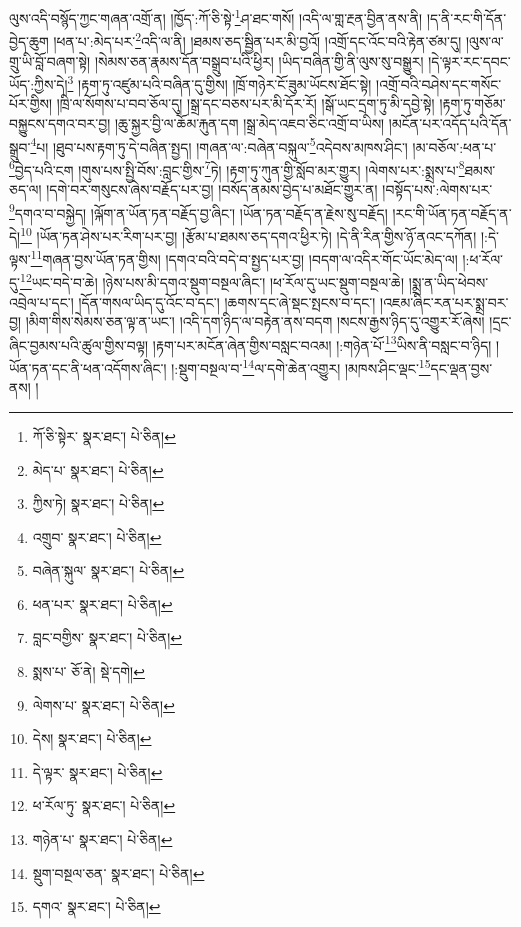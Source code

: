 ལུས་འདི་བསྙོད་ཀྱང་གཞན་འགྲོ་ན། །ཁྱོད་:ཀོ་ཅི་སྟེ་\footnote{ཀོ་ཅི་སྟེར་  སྣར་ཐང་།  པེ་ཅིན། }ཤ་ཐང་གསོ། །འདི་ལ་གླ་རྔན་བྱིན་ནས་ནི། །ད་ནི་རང་གི་དོན་བྱེད་ཆུག །ཕན་པ་:མེད་པར་\footnote{མེད་པ་  སྣར་ཐང་།  པེ་ཅིན། }འདི་ལ་ནི། །ཐམས་ཅད་སྦྱིན་པར་མི་བྱའོ། །འགྲོ་དང་འོང་བའི་རྟེན་ཙམ་དུ། །ལུས་ལ་གྲུ་ཡི་བློ་བཞག་སྟེ། །སེམས་ཅན་རྣམས་དོན་བསྒྲུབ་པའི་ཕྱིར། །ཡིད་བཞིན་གྱི་ནི་ལུས་སུ་བསྒྱུར། །དེ་ལྟར་རང་དབང་ཡོད་:ཀྱིས་དེ།\footnote{ཀྱིས་ཏེ།  སྣར་ཐང་།  པེ་ཅིན། } །རྟག་ཏུ་འཛུམ་པའི་བཞིན་དུ་གྱིས། །ཁྲོ་གཉེར་ངོ་ཟུམ་ཡོངས་ཐོང་སྟེ། །འགྲོ་བའི་བཤེས་དང་གསོང་པོར་གྱིས། །ཁྲི་ལ་སོགས་པ་བབ་ཅོལ་དུ། །སྒྲ་དང་བཅས་པར་མི་དོར་རོ། །སྒོ་ཡང་དྲག་ཏུ་མི་དབྱེ་སྟེ། །རྟག་ཏུ་གཅོམ་བསྐྱུངས་དགའ་བར་བྱ། །ཆུ་སྐྱར་བྱི་ལ་ཆོམ་རྐུན་དག །སྒྲ་མེད་འཇབ་ཅིང་འགྲོ་བ་ཡིས། །མངོན་པར་འདོད་པའི་དོན་སྒྲུབ་\footnote{འགྲུབ་  སྣར་ཐང་།  པེ་ཅིན། }པ། །ཐུབ་པས་རྟག་ཏུ་དེ་བཞིན་སྤྱད། །གཞན་ལ་:བཞེན་བསྐུལ་\footnote{བཞེན་སྐུལ་  སྣར་ཐང་།  པེ་ཅིན། }འདེབས་མཁས་ཤིང་། །མ་བཅོལ་:ཕན་པ་\footnote{ཕན་པར་  སྣར་ཐང་།  པེ་ཅིན། }བྱེད་པའི་ངག །གུས་པས་སྤྱི་བོས་:བླང་གྱིས་\footnote{བླང་བགྱིས་  སྣར་ཐང་།  པེ་ཅིན། }ཏེ། །རྟག་ཏུ་ཀུན་གྱི་སློབ་མར་གྱུར། །ལེགས་པར་:སྨྲས་པ་\footnote{སྨས་པ་  ཅོ་ནེ།  སྡེ་དགེ། }ཐམས་ཅད་ལ། །དགེ་བར་གསུངས་ཞེས་བརྗོད་པར་བྱ། །བསོད་ནམས་བྱེད་པ་མཐོང་གྱུར་ན། །བསྟོད་པས་:ལེགས་པར་\footnote{ལེགས་པ་  སྣར་ཐང་།  པེ་ཅིན། }དགའ་བ་བསྐྱེད། །ལྐོག་ན་ཡོན་ཏན་བརྗོད་བྱ་ཞིང་། །ཡོན་ཏན་བརྗོད་ན་རྗེས་སུ་བརྗོད། །རང་གི་ཡོན་ཏན་བརྗོད་ན་དེ།\footnote{དེས།  སྣར་ཐང་།  པེ་ཅིན། } །ཡོན་ཏན་ཤེས་པར་རིག་པར་བྱ། །རྩོམ་པ་ཐམས་ཅད་དགའ་ཕྱིར་ཏེ། །དེ་ནི་རིན་གྱིས་ཉོ་ནའང་དཀོན། །:དེ་ལྟས་\footnote{དེ་ལྟར་  སྣར་ཐང་།  པེ་ཅིན། }གཞན་བྱས་ཡོན་ཏན་གྱིས། །དགའ་བའི་བདེ་བ་སྤྱད་པར་བྱ། །བདག་ལ་འདིར་གོང་ཡོང་མེད་ལ། །:ཕ་རོལ་དུ་\footnote{ཕ་རོལ་ཏུ་  སྣར་ཐང་།  པེ་ཅིན། }ཡང་བདེ་བ་ཆེ། །ཉེས་པས་མི་དགའ་སྡུག་བསྔལ་ཞིང་། །ཕ་རོལ་དུ་ཡང་སྡུག་བསྔལ་ཆེ། །སྨྲ་ན་ཡིད་ཕེབས་འབྲེལ་པ་དང་། །དོན་གསལ་ཡིད་དུ་འོང་བ་དང་། །ཆགས་དང་ཞེ་སྡང་སྤངས་བ་དང་། །འཇམ་ཞིང་རན་པར་སྨྲ་བར་བྱ། །མིག་གིས་སེམས་ཅན་ལྟ་ན་ཡང་། །འདི་དག་ཉིད་ལ་བརྟེན་ནས་བདག །སངས་རྒྱས་ཉིད་དུ་འགྱུར་རོ་ཞེས། །དྲང་ཞིང་བྱམས་པའི་ཚུལ་གྱིས་བལྟ། །རྟག་པར་མངོན་ཞེན་གྱིས་བསླང་བའམ། །:གཉེན་པོ་\footnote{གཉེན་པ་  སྣར་ཐང་།  པེ་ཅིན། }ཡིས་ནི་བསླང་བ་ཉིད། །ཡོན་ཏན་དང་ནི་ཕན་འདོགས་ཞིང་། །:སྡུག་བསྔལ་བ་\footnote{སྡུག་བསྔལ་ཅན་  སྣར་ཐང་།  པེ་ཅིན། }ལ་དགེ་ཆེན་འགྱུར། །མཁས་ཤིང་ལྡང་\footnote{དགའ་  སྣར་ཐང་།  པེ་ཅིན། }དང་ལྡན་བྱས་ནས། །
